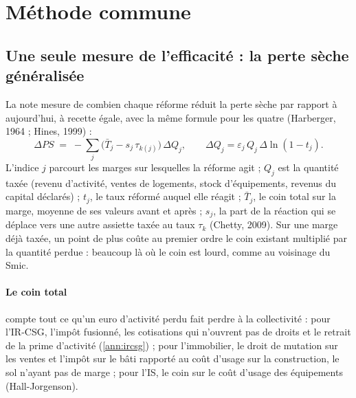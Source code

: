 \documentclass[11pt,a4paper]{article}
\begin{document}
\section{Méthode commune}\label{ann:methode}

\subsection{Une seule mesure de l'efficacité : la perte sèche généralisée}\label{ann:meth_ps}

La note mesure de combien chaque réforme réduit la perte sèche par rapport à aujourd'hui, à recette égale, avec la
même formule pour les quatre (Harberger, 1964 ; Hines, 1999) :
\[
\Delta PS \;=\; -\sum_j \big(\bar T_j - s_j\,\tau_{k(j)}\big)\,\Delta Q_j ,\qquad
\Delta Q_j = \varepsilon_j\,Q_j\,\Delta\ln(1-t_j).
\]
L'indice $j$ parcourt les marges sur lesquelles la réforme agit ; $Q_j$ est la quantité taxée (revenu d'activité,
ventes de logements, stock d'équipements, revenus du capital déclarés) ; $t_j$, le taux réformé auquel elle réagit ;
$\bar T_j$, le coin total sur la marge, moyenne de ses valeurs avant et après ; $s_j$, la part de la réaction qui se
déplace vers une autre assiette taxée au taux $\tau_k$ (Chetty, 2009). Sur une marge déjà taxée, un point de plus coûte
au premier ordre le coin existant multiplié par la quantité perdue : beaucoup là où le coin est lourd, comme au
voisinage du Smic.

\paragraph{Le coin total} compte tout ce qu'un euro d'activité perdu fait perdre à la collectivité : pour l'IR-CSG,
l'impôt fusionné, les cotisations qui n'ouvrent pas de droits et le retrait de la prime d'activité (\ref{ann:ircsg}) ;
pour l'immobilier, le droit de mutation sur les ventes et l'impôt sur le bâti rapporté au coût d'usage sur la
construction, le sol n'ayant pas de marge ; pour l'IS, le coin sur le coût d'usage des équipements (Hall-Jorgenson).
\end{document}
